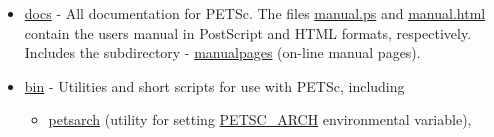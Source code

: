 \begin{itemize}
\item \url{docs} - All documentation for PETSc. The files \url{manual.ps}
                   and \url{manual.html} contain the users manual in
                   PostScript and HTML formats, respectively. Includes
                   the subdirectory
 \subitem - \url{manualpages} (on-line manual pages).
\item \url{bin} - Utilities and short scripts for use with PETSc, including
 \begin{itemize}
 \item \url{petsarch} (utility for setting \url{PETSC_ARCH} environmental variable),
 \end{itemize}


\end{itemize}
